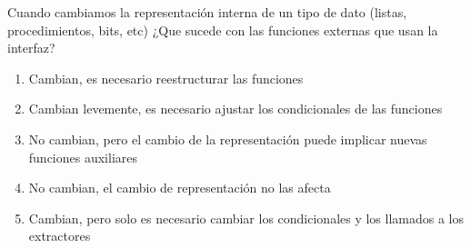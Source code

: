 {
Cuando cambiamos la representación interna de un tipo de dato (listas, procedimientos, bits, etc) ¿Que sucede con las funciones externas que usan la interfaz?

	\begin{enumerate}
		\item Cambian, es necesario reestructurar las funciones
		\item Cambian levemente, es necesario ajustar los condicionales de las funciones
		\item No cambian, pero el cambio de la representación puede implicar nuevas funciones auxiliares
		\item No cambian, el cambio de representación no las afecta %
		\item Cambian, pero solo es necesario cambiar los condicionales y los llamados a los extractores
	\end{enumerate}
}
